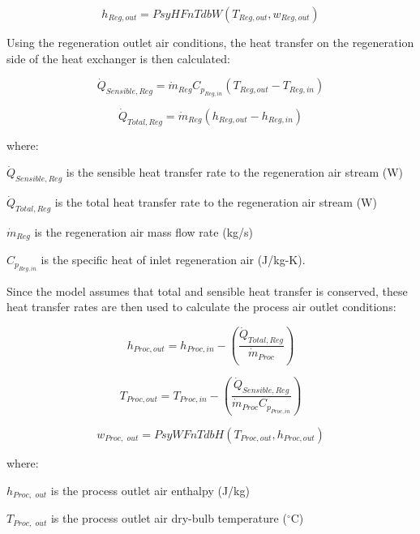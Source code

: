 \begin{equation}
{h_{Reg,out}} = PsyHFnTdbW\left( {{T_{Reg,out}},{w_{Reg,out}}} \right)
\end{equation}

Using the regeneration outlet air conditions, the heat transfer on the regeneration side of the heat exchanger is then calculated:

\begin{equation}
{\dot{Q}_{Sensible,Reg}} = {\dot{m}_{Reg}}{C_{p_{Reg,in}}} \left( {{T_{Reg,out}} - {T_{Reg,in}}} \right)
\end{equation}

\begin{equation}
{\dot{Q}_{Total,Reg}} = {\dot{m}_{Reg}} \left( {{h_{Reg,out}} - {h_{Reg,in}}} \right)
\end{equation}

where:

\({\dot{Q}_{Sensible,Reg}}\) is the sensible heat transfer rate to the regeneration air stream (W)

\({\dot{Q}_{Total,Reg}}\) is the total heat transfer rate to the regeneration air stream (W)

\({\dot{m}_{Reg}}\) is the regeneration air mass flow rate (kg/s)

\({C_{p_{Reg,in}}}\) is the specific heat of inlet regeneration air (J/kg-K).

Since the model assumes that total and sensible heat transfer is conserved, these heat transfer rates are then used to calculate the process air outlet conditions:

\begin{equation}
{h_{Proc,out}} = {h_{Proc,in}} - \left( {\frac{\dot{Q}_{Total,Reg}}{\dot{m}_{Proc}}} \right)
\end{equation}

\begin{equation}
{T_{Proc,out}} = {T_{Proc,in}} - \left( {\frac{\dot{Q}_{Sensible,Reg}}{{\dot{m}_{Proc}}C_{p_{Proc,in}}}} \right)
\end{equation}

\begin{equation}
{w_{Proc,\,\,out}} = PsyWFnTdbH\left( {{T_{Proc,out}},{h_{Proc,out}}} \right)
\end{equation}

where:

\({h_{Proc,\,\,out}}\) is the process outlet air enthalpy (J/kg)

\({T_{Proc,\,\,out}}\) is the process outlet air dry-bulb temperature (\(^{\circ}\)C)

